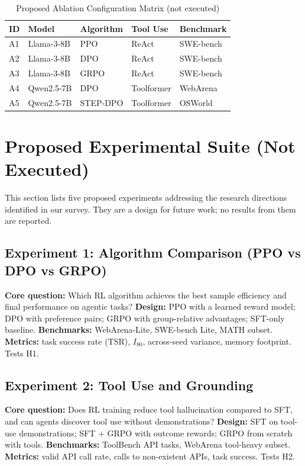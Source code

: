 \documentclass[12pt,a4paper]{report}
\theoremstyle{definition}
\begin{document}
\begin{table}[h]
\centering
\caption{Proposed Ablation Configuration Matrix (not executed)}
\label{tab:ablation}
\begin{tabular}{lllll}
\toprule
\textbf{ID} & \textbf{Model} & \textbf{Algorithm} & \textbf{Tool Use} & \textbf{Benchmark} \\
\midrule
A1 & Llama-3-8B & PPO & ReAct & SWE-bench \\
A2 & Llama-3-8B & DPO & ReAct & SWE-bench \\
A3 & Llama-3-8B & GRPO & ReAct & SWE-bench \\
A4 & Qwen2.5-7B & DPO & Toolformer & WebArena \\
A5 & Qwen2.5-7B & STEP-DPO & Toolformer & OSWorld \\
\bottomrule
\end{tabular}
\end{table}

\section*{Proposed Experimental Suite (Not Executed)}
\label{sec:comprehensive_experiments}

This section lists five proposed experiments addressing the research directions identified in our survey. They are a design for future work; no results from them are reported.

\subsection*{Experiment 1: Algorithm Comparison (PPO vs DPO vs GRPO)}
\textbf{Core question:} Which RL algorithm achieves the best sample efficiency and final performance on agentic tasks? \textbf{Design:} PPO with a learned reward model; DPO with preference pairs; GRPO with group-relative advantages; SFT-only baseline. \textbf{Benchmarks:} WebArena-Lite, SWE-bench Lite, MATH subset. \textbf{Metrics:} task success rate (TSR), $I_{80}$, across-seed variance, memory footprint. Tests H1.

\subsection*{Experiment 2: Tool Use and Grounding}
\textbf{Core question:} Does RL training reduce tool hallucination compared to SFT, and can agents discover tool use without demonstrations? \textbf{Design:} SFT on tool-use demonstrations; SFT + GRPO with outcome rewards; GRPO from scratch with tools. \textbf{Benchmarks:} ToolBench API tasks, WebArena tool-heavy subset. \textbf{Metrics:} valid API call rate, calls to non-existent APIs, task success. Tests H2.
\end{document}
